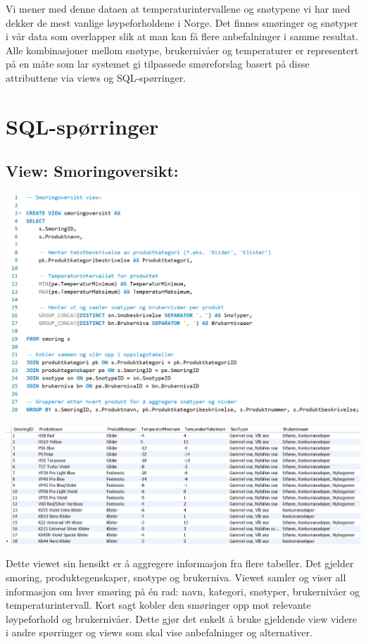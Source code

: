 \documentclass[10pt, a4paper]{article}
\begin{document}
Vi mener med denne dataen at temperaturintervallene og snøtypene vi har med dekker de mest vanlige løypeforholdene i Norge. Det finnes smøringer og snøtyper i vår data som overlapper slik at man kan få flere anbefalninger i samme resultat. Alle kombinasjoner mellom snøtype, brukernivåer og temperaturer er representert på en måte som lar systemet gi tilpassede smøreforslag basert på disse attributtene via views og SQL-spørringer.

\section{SQL-spørringer}

\subsection{View: Smoringoversikt:}

\includegraphics[width=\textwidth]{smoringoversikt.png}

\includegraphics[width=\textwidth]{smoringoversikt_resultat.png}

Dette viewet sin hensikt er å aggregere informasjon fra flere tabeller. Det gjelder smoring, produktegenskaper, snotype og brukerniva. Viewet samler og viser all informasjon om hver smøring på én rad: navn, kategori, snøtyper, brukernivåer og temperaturintervall. Kort sagt kobler den smøringer opp mot relevante løypeforhold og brukernivåer. Dette gjør det enkelt å bruke gjeldende view videre i andre spørringer og views som skal vise anbefalninger og alternativer.
\end{document}
